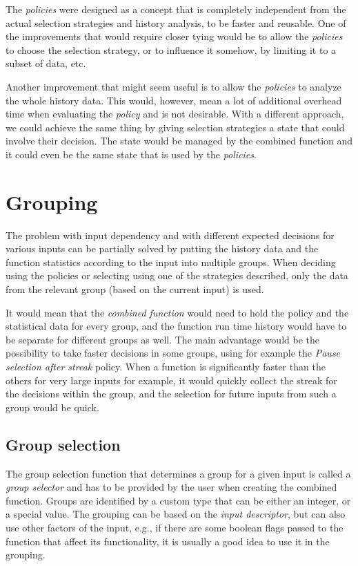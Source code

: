 The \textit{policies} were designed as a concept that is completely independent from the actual selection strategies and history analysis, to be faster and reusable. One of the improvements that would require closer tying would be to allow the \textit{policies} to choose the selection strategy, or to influence it somehow, by limiting it to a subset of data, etc. 

Another improvement that might seem useful is to allow the \textit{policies} to analyze the whole history data. This would, however, mean a lot of additional overhead time when evaluating the \textit{policy} and is not desirable.
With a different approach, we could achieve the same thing by giving selection strategies a state that could involve their decision. The state would be managed by the combined function and it could even be the same state that is used by the \textit{policies}. 


\section{Grouping}

The problem with input dependency and with different expected decisions for various inputs can be partially solved by putting the history data and the function statistics according to the input into multiple groups. When deciding using the policies or selecting using one of the strategies described, only the data from the relevant group (based on the current input) is used. 

It would mean that the \textit{combined function} would need to hold the policy and the statistical data for every group, and the function run time history would have to be separate for different groups as well. The main advantage would be the possibility to take faster decisions in some groups, using for example the \textit{Pause selection after streak} policy. When a function is significantly faster than the others for very large inputs for example, it would quickly collect the streak for the decisions within the group, and the selection for future inputs from such a group would be quick.

\subsection{Group selection}
\label{subsec:group_selection}

The group selection function that determines a group for a given input is called a \textit{group selector} and has to be provided by the user when creating the combined function. Groups are identified by a custom type that can be either an integer, or a special  value. The grouping can be based on the \textit{input descriptor}, but can also use other factors of the input, e.g., if there are some boolean flags passed to the function that affect its functionality, it is usually a good idea to use it in the grouping.

